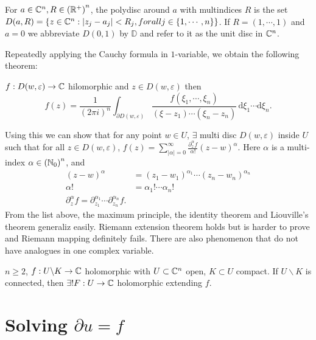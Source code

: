 \begin{definition}
  For $a\in \mathbb{C}^{n}, R\in \left( \mathbb{R}^{+} \right) ^{n}$, the polydisc around $a$ with multindices $R$ is the set $D(a,R)=\left\{z\in \mathbb{C}^{n}:|z_j-a_j|<R_j,\\forall j\in \left\{1,\cdots ,n\right\} \right\} $. If $R=(1,\cdots ,1)$ and $a=0$ we abbreviate $D(0,1)$ by $\mathbb{D}$ and refer to it as the unit disc in $\mathbb{C}^{n}$. 
\end{definition}
Repeatedly applying the Cauchy formula in $1$-variable, we obtain the following theorem:
\begin{theorem}
  $f:D(w,\varepsilon )\to \mathbb{C}$ hilomorphic and $z\in D(w,\varepsilon )$ then 
  \[
    f(z)=\frac{1}{\left( 2\pi i \right) ^{n}}\int_{\partial D(w,\varepsilon )}\frac{f(\xi_1,\cdots ,\xi_n)}{(\xi-z_1)\cdots (\xi_n-z_n)}\,\mathrm{d}\xi_1\cdots \mathrm{d}\xi_n.
  \] 
\end{theorem}
Using this we can show that for any point $w\in U$, $\exists $ multi disc $D(w,\varepsilon )$ inside $U$ such that for all $z\in D(w,\varepsilon )$, $f(z)=\sum_{|\alpha|=0}^{\infty} \frac{\partial^{\alpha}_z f}{\alpha!}(z-w)^{\alpha}$. Here $\alpha$ is a multi-index $\alpha \in \left( \mathbb{N}_0 \right) ^{n}$, and 
\begin{align*}
  (z-w)^{\alpha}&= (z_1-w_1)^{\alpha_1}\cdots (z_n-w_n)^{\alpha_n} \\
  \alpha! &= \alpha_1!\cdots \alpha_n! \\
  \partial^{\alpha}_{z}f=\partial_{z_1}^{\alpha_1}\cdots \partial_{z_n}^{\alpha_n}f
.\end{align*}
From the list above, the maximum principle, the identity theorem and Liouville's theorem generaliz easily.
Riemann extension theorem holds but is harder to prove and Riemann mapping definitely fails. There are also phenomenon that do not have analogues in one complex variable. 
\begin{theorem}
  $n\ge 2$, $f:U \backslash  K\to \mathbb{C}$ holomorphic with $U \subset  \mathbb{C}^{n}$ open, $K\subset U$ compact. If $U \backslash  K$ is connected, then $\exists ! F:U\to \mathbb{C}$ holomorphic extending $f$.
\end{theorem}

\section{Solving $\partial u = f$}

